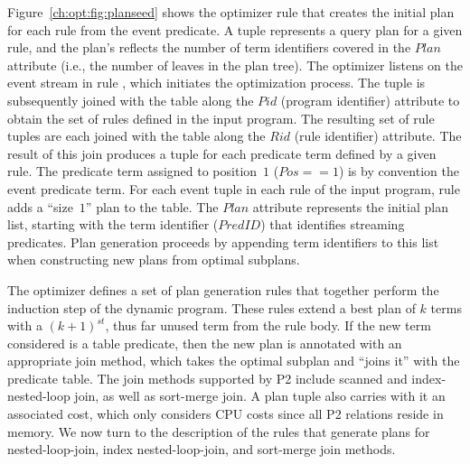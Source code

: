 Figure~\ref{ch:opt:fig:planseed} shows the optimizer rule that creates the
initial plan for each rule from the event predicate.  A  tuple
represents a query plan for a given rule, and the plan's  reflects the
number of term identifiers covered in the $Plan$ attribute (i.e., the number of
leaves in the plan tree).  The optimizer listens on the
 event stream in rule , which initiates the
optimization process.  The  tuple is subsequently
joined with the  table along the $Pid$ (program identifier)
attribute to obtain the set of rules defined in the input program.  The
resulting set of rule tuples are each joined with the  table
along the $Rid$ (rule identifier) attribute.  The result of this join produces
a tuple for each predicate term defined by a given rule.  The predicate term
assigned to position~$1$ ($Pos == 1$) is by convention the event predicate
term.  For each event  tuple in each rule of the input
program, rule  adds a ``size~$1$'' plan to the  table.  The
$Plan$ attribute represents the initial plan list, starting with the term
identifier ($PredID$) that identifies streaming predicates.  Plan generation
proceeds by appending term identifiers to this list when constructing new plans
from optimal subplans.

The \OVERLOG optimizer defines a set of plan generation rules that together
perform the induction step of the dynamic program.  These rules extend a best
plan of $k$ terms with a $(k+1)^{st}$, thus far unused term from the rule body.
If the new term considered is a table predicate, then the new plan is annotated
with an appropriate join method, which takes the optimal subplan and ``joins
it'' with the predicate table.  The join methods supported by P2 include
scanned and index-nested-loop join, as well as sort-merge join.  A plan tuple
also carries with it an associated cost, which only considers CPU costs since
all P2 relations reside in memory.  We now turn to the description of the rules
that generate plans for nested-loop-join, index nested-loop-join, and
sort-merge join methods.

